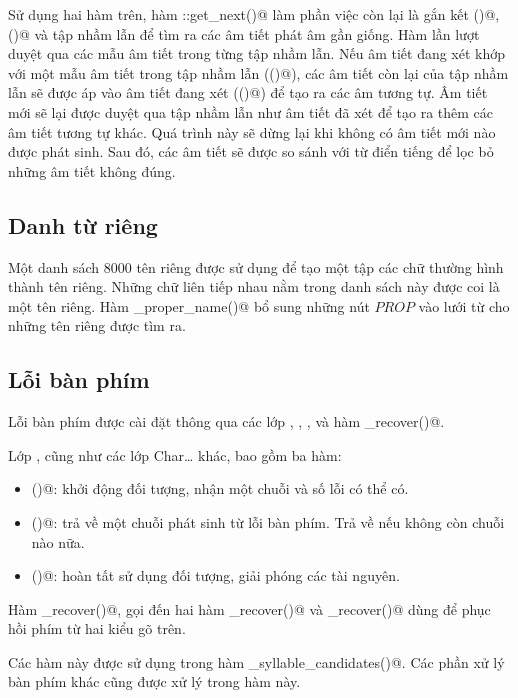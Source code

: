 \documentclass[a4paper,oneside,14pt]{extbook} %
\begin{document}
Sử dụng hai hàm trên, hàm
\verb@FuzzyWordState::get_next()@ làm phần việc còn
lại là gắn kết \verb@match()@, \verb@apply()@ và tập nhầm lẫn để tìm
ra các âm tiết phát âm gần giống. Hàm lần lượt duyệt qua các mẫu âm
tiết trong từng tập nhầm lẫn. Nếu âm tiết đang xét khớp với một mẫu âm
tiết trong tập nhầm lẫn (\verb@match()@), các âm tiết còn lại của tập
nhầm lẫn sẽ được áp vào âm tiết đang xét (\verb@apply()@) để tạo ra
các âm tương tự. Âm tiết mới sẽ lại được duyệt qua tập nhầm lẫn như âm
tiết đã xét để tạo ra thêm các âm tiết tương tự khác. Quá trình này sẽ
dừng lại khi không có âm tiết mới nào được phát sinh. Sau đó, các âm
tiết sẽ được so sánh với từ điển tiếng để lọc bỏ những âm tiết không
đúng.

\subsection{Danh từ riêng}

Một danh sách 8000 tên riêng được sử dụng để tạo một tập các chữ
thường hình thành tên riêng.
Những chữ liên tiếp nhau nằm trong danh sách này được coi là một tên
riêng. Hàm \verb@mark_proper_name()@ bổ sung những nút $PROP$ vào lưới
từ cho những tên riêng được tìm ra.

\subsection{Lỗi bàn phím}

Lỗi bàn phím được cài đặt thông qua các lớp \verb@KeyRecover@,
\verb@CharInserter@, \verb@CharEraser@, \verb@CharTransposer@ và
hàm \verb@im_recover()@.

Lớp \verb@KeyRecover@, cũng như các lớp Char\ldots{} khác, bao gồm ba hàm:
\begin{itemize}
\item \verb@init()@: khởi động đối tượng, nhận một chuỗi và số lỗi có
  thể có.
\item \verb@step()@: trả về một chuỗi phát sinh từ lỗi bàn phím. Trả
  về \verb@false@ nếu không còn chuỗi nào nữa.
\item \verb@done()@: hoàn tất sử dụng đối tượng, giải phóng các tài
  nguyên.
\end{itemize}

Hàm \verb@im_recover()@, gọi đến hai hàm \verb@vni_recover()@ và
\verb@telex_recover()@ dùng để phục hồi phím từ hai kiểu gõ trên.

Các hàm này được sử dụng trong hàm \verb@get_syllable_candidates()@.
Các phần xử lý bàn phím khác cũng được xử lý trong hàm này.
\end{document}
